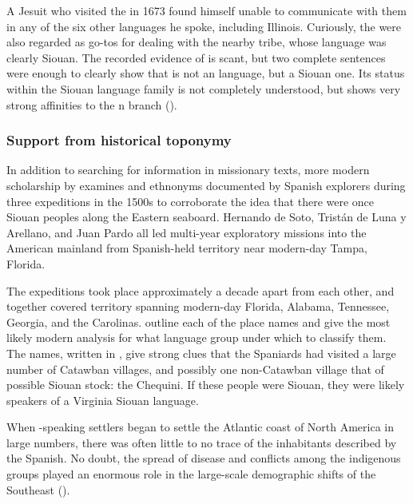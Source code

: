 \documentclass[output=paper]{LSP/langsci}
\begin{document}
A Jesuit who visited the  in 1673 found himself unable to communicate with them in any of the six other languages he spoke, including Illinois. Curiously, the  were also regarded as go-tos for dealing with the nearby  tribe, whose language was clearly Siouan. The recorded evidence of  is scant, but two complete sentences were enough to clearly show that  is not an  language, but a Siouan one. Its status within the Siouan language family is not completely understood, but  shows very strong affinities to the n branch (\citealt{Koontz1995a,Koontz1995b}).

\largerpage
\subsubsection{Support from historical toponymy} In addition to searching for information in missionary texts, more modern scholarship by \citet{BookerEtAl1992} examines  and ethnonyms documented by Spanish explorers during three expeditions in the 1500s to corroborate the idea that there were once Siouan peoples along the Eastern seaboard. Hernando de Soto, Trist\'an de Luna y Arellano, and Juan Pardo all led multi-year exploratory missions into the American mainland from Spanish-held territory near modern-day Tampa, Florida. 

The expeditions took place approximately a decade apart from each other, and together covered territory spanning modern-day Florida, Alabama, Tennessee, Georgia, and the Carolinas. \citet{BookerEtAl1992} outline each of the place names and give the most likely modern analysis for what language group under which to classify them. The names, written in  , give strong clues that the Spaniards had visited a large number of Catawban villages, and possibly one non-Catawban village that of possible Siouan stock: the Chequini. If these people were Siouan, they were likely speakers of a Virginia Siouan language.

When -speaking settlers began to settle the Atlantic coast of North America in large numbers, there was often little to no trace of the inhabitants described by the Spanish. No doubt, the spread of disease and conflicts among the indigenous groups played an enormous role in the large-scale demographic shifts of the Southeast (\citealt{Mann2006}). 
\end{document}
